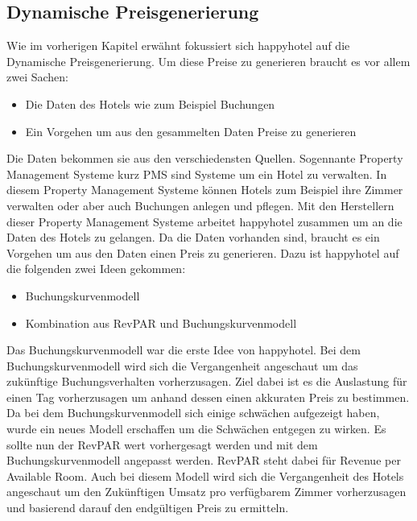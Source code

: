 \subsection{Dynamische Preisgenerierung}
\label{subsec:Preisgenerierung}
Wie im vorherigen Kapitel erwähnt fokussiert sich happyhotel auf die Dynamische Preisgenerierung. Um diese Preise zu generieren braucht es vor allem zwei Sachen:
\begin{itemize}
    \item Die Daten des Hotels wie zum Beispiel Buchungen
    \item Ein Vorgehen um aus den gesammelten Daten Preise zu generieren
\end{itemize}

Die Daten bekommen sie aus den verschiedensten Quellen. Sogennante Property Management Systeme kurz PMS sind Systeme um ein Hotel zu verwalten. In diesem Property Management Systeme können Hotels zum Beispiel ihre Zimmer verwalten oder aber auch Buchungen anlegen und pflegen. Mit den Herstellern dieser Property Management Systeme arbeitet happyhotel zusammen um an die Daten des Hotels zu gelangen. 
\newline
Da die Daten vorhanden sind, braucht es ein Vorgehen um aus den Daten einen Preis zu generieren. Dazu ist happyhotel auf die folgenden zwei Ideen gekommen:
\begin{itemize}
    \item Buchungskurvenmodell
    \item Kombination aus RevPAR und Buchungskurvenmodell
\end{itemize}

Das Buchungskurvenmodell war die erste Idee von happyhotel. Bei dem Buchungskurvenmodell wird sich die Vergangenheit angeschaut um das zukünftige Buchungsverhalten vorherzusagen. Ziel dabei ist es die Auslastung für einen Tag vorherzusagen um anhand dessen einen akkuraten Preis zu bestimmen. 
\newline
\newline
Da bei dem Buchungskurvenmodell sich einige schwächen aufgezeigt haben, wurde ein neues Modell erschaffen um die Schwächen entgegen zu wirken. Es sollte nun der RevPAR wert vorhergesagt werden und mit dem Buchungskurvenmodell angepasst werden. RevPAR steht dabei für Revenue per Available Room. Auch bei diesem Modell wird sich die Vergangenheit des Hotels angeschaut um den Zukünftigen Umsatz pro verfügbarem Zimmer vorherzusagen und basierend darauf den endgültigen Preis zu ermitteln.